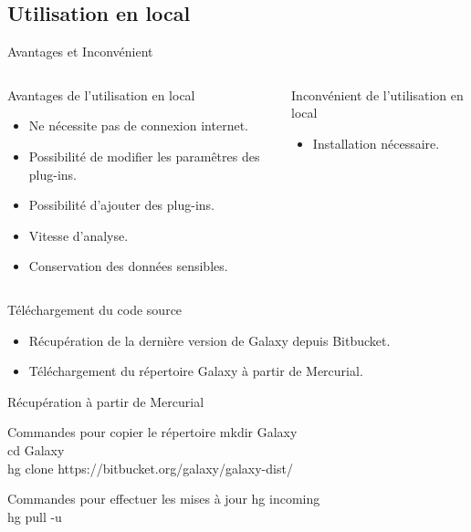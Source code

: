 \documentclass[12pt]{beamer}
\begin{document}
\subsection{Utilisation en local}
\begin{frame}{Avantages et Inconvénient}
\begin{columns}
\begin{column}{0.5\textwidth}
\begin{block}{Avantages de l'utilisation en local}
\begin{itemize}
\item Ne nécessite pas de connexion internet.
\item Possibilité de modifier les paramêtres des plug-ins.
\item Possibilité d'ajouter des plug-ins.
\item Vitesse d'analyse.
\item Conservation des données sensibles.
\end{itemize}
\end{block}
\end{column}
\begin{column}{0.5\textwidth}
\begin{block}{Inconvénient de l'utilisation en local}
\begin{itemize}
\item Installation nécessaire.
\end{itemize}
\end{block}
\end{column}
\end{columns}
\end{frame}

\begin{frame}{Téléchargement du code source}
\begin{block}{}
\begin{itemize}
\item Récupération de la dernière version de Galaxy depuis Bitbucket.
\item Téléchargement du répertoire Galaxy à partir de Mercurial.
\end{itemize}
\end{block}
\end{frame}

\begin{frame}{Récupération à partir de  Mercurial}
\begin{block}{Commandes pour copier le répertoire}
mkdir Galaxy\\
cd Galaxy\\
hg clone https://bitbucket.org/galaxy/galaxy-dist/\\
\end{block}
\begin{block}{Commandes pour effectuer les mises à jour}
hg incoming\\
hg pull -u\\
\end{block}
\end{frame}
\end{document}
